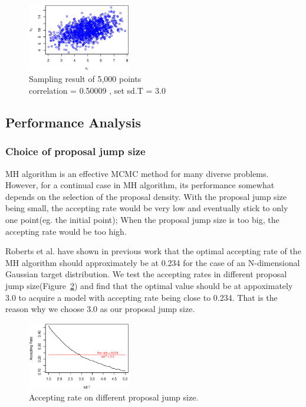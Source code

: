\begin{figure}[tb]
  	\centering
  	\includegraphics[width=0.4\textwidth]{figure/sample_result.eps}
	\caption{Sampling result of 5,000 points \protect\\ correlation = 0.50009 , set sd.T = 3.0}
	\label{fig:sample_result}
\end{figure}




\subsection{Performance Analysis}

\subsubsection{Choice of proposal jump size}
MH algorithm is an effective MCMC method for many diverse problems. However, for a continual case in MH algorithm, its performance somewhat depends on the selection of the proposal density. With the proposal jump size being small, the accepting rate would be very low and eventually stick to only one point(eg. the initial point); When the proposal jump size is too big, the accepting rate would be too high. 

Roberts et al. have shown in previous work\cite{roberts1997weak} that the optimal accepting rate of the MH algorithm should approximately be at 0.234 for the case of an N-dimensional Gaussian target distribution. We test the accepting rates in different proposal jump size(Figure~\ref{fig:acc_sdt}) and find that the optimal value should be at appoximately 3.0 to acquire a model with accepting rate being close to 0.234. That is the reason why we choose 3.0 as our proposal jump size.

\begin{figure}[tb]
  	\centering
  	\includegraphics[width=0.4\textwidth]{figure/acc_sdt.eps}
	\caption{Accepting rate on different proposal jump size.}
	\label{fig:acc_sdt}
\end{figure}

